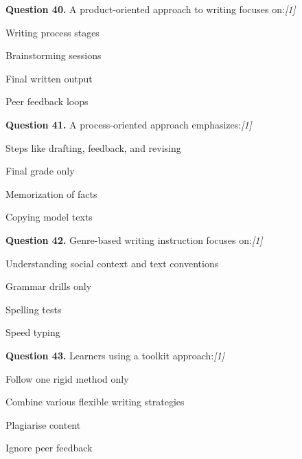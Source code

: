 \documentclass[11pt,a4paper]{article}
\newcommand{\pts}[1]{\hfill   \textit{[#1]}}
\begin{document}
\medskip




\noindent   \textbf{Question 40.} A product-oriented approach to writing focuses on:\pts{1}

\begin{parts}
  \item Writing process stages
  \item Brainstorming sessions
  \item Final written output
  \item Peer feedback loops
\end{parts}

\medskip




\noindent   \textbf{Question 41.} A process-oriented approach emphasizes:\pts{1}

\begin{parts}
  \item Steps like drafting, feedback, and revising
  \item Final grade only
  \item Memorization of facts
  \item Copying model texts
\end{parts}

\medskip




\noindent   \textbf{Question 42.} Genre-based writing instruction focuses on:\pts{1}

\begin{parts}
  \item Understanding social context and text conventions
  \item Grammar drills only
  \item Spelling tests
  \item Speed typing
\end{parts}

\medskip




\noindent   \textbf{Question 43.} Learners using a toolkit approach:\pts{1}

\begin{parts}
  \item Follow one rigid method only
  \item Combine various flexible writing strategies
  \item Plagiarise content
  \item Ignore peer feedback
\end{parts}
\end{document}
